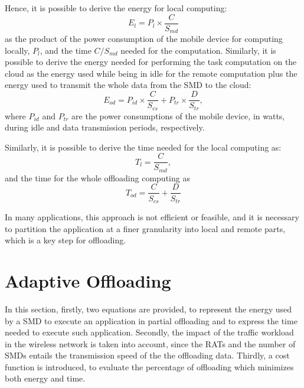 \documentclass[twoside,openright]{report}
\begin{document}
Hence, it is possible to derive the energy for local computing:
	 \begin{equation}
	 \label{eq:E_locale}
	 E_{l} = P_{l}\times\frac{C}{S_{\textit{md}}} 
	 \end{equation}
as the product of the power consumption of the mobile device for computing locally, $P_{l}$, and the time $C/S_{\textit{md}}$ needed for the computation. Similarly, it is possible to derive the energy needed for performing the task computation on the cloud as the energy used while being in idle for the remote computation plus the energy used to transmit the whole data from the \gls{SMD} to the cloud:
\begin{equation}
	 \label{eq:E_OD100}
	 E_{\textit{od}} = P_{\textit{id}}\times\frac{C}{S_{\textit{cs}}} + P_{\textit{tr}}\times\frac{D}{S_{\textit{tr}}},
	 \end{equation}
%
where $P_{\textit{id}}$ and $P_{\textit{tr}}$ are the power consumptions of the mobile device, in watts, during idle and data transmission periods, respectively.
 
Similarly, it is possible to derive the time needed for the local computing as:
	\begin{equation}
	\label{eq:T_locale}
	T_{l} = \frac{C}{S_{\textit{md}}}, 
	\end{equation}
	and the time for the whole offloading computing as 
	\begin{equation}
	\label{eq:T_OD100}
	T_{\textit{od}} = \frac{C}{S_{\textit{cs}}} + \frac{D}{S_{\textit{tr}}}
	\end{equation}

In many applications, this approach is not efficient or feasible, and it is necessary to partition the application at a finer granularity into local and remote parts, which is a key step for offloading.	

\section{Adaptive Offloading}
In this section, firstly, two equations are provided, to represent the energy used by a \gls{SMD} to execute an application in partial offloading and to express the time needed to execute such application. 
Secondly, the impact of the traffic workload in the wireless network is taken into account, since the \glspl{RAT} and the number of \glspl{SMD} entails the transmission speed of the the offloading data. 
Thirdly, a cost function is introduced, to evaluate the percentage of offloading which minimizes both energy and time.
\end{document}
